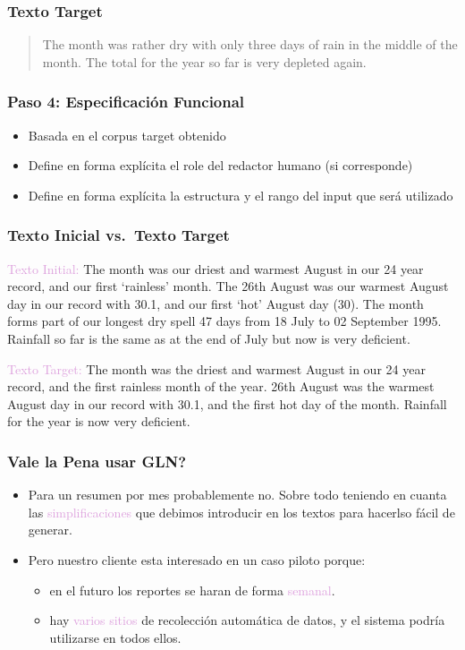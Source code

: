 \documentclass[compress,color=usenames]{beamer}
\newcommand{\mH}[1]{\textcolor{Plum}{#1}}
\begin{document}
\begin{frame}
\frametitle{Texto Target}

\begin{quote}
 { {The month was rather dry with only three days of rain in the middle of the month. The total for the year so far is very depleted again.}}
\end{quote}

\end{frame}

\begin{frame}
\frametitle{Paso 4: Especificaci\'on Funcional}

\label{f104}
\begin{itemize}
\item { {Basada en el corpus target obtenido}}
\item { {Define en forma expl\'icita el role del redactor humano (si corresponde)}}
\item { {Define en forma expl\'icita la estructura y el rango del input que ser\'a utilizado}}
\end{itemize}

\end{frame}

\begin{frame}
\frametitle{Texto Inicial vs.\ Texto Target}

\mH{Texto Initial:} The month was our driest and warmest August in our 24 year record, and our first `rainless' month. The 26th August was our warmest August day in our record with 30.1, and our first `hot' August day (30). The month forms part of our longest dry spell 47 days from 18 July to 02 September 1995. Rainfall so far is the same as at the end of July but now is very deficient.
\bigskip

\mH{Texto Target:} The month was the driest and warmest August in our 24 year record, and the first rainless month of the year. 26th August was the warmest August day in our record with 30.1, and the first hot day of the month. Rainfall for the year is now very deficient.
 \end{frame}

\begin{frame}
\frametitle{Vale la Pena usar GLN?}

\begin{itemize}
\item Para un resumen por mes probablemente no.  Sobre todo teniendo en cuanta las \mH{simplificaciones} que debimos introducir en los textos para hacerlso f\'acil de generar.

\item Pero nuestro cliente esta interesado en un caso piloto porque: 
\begin{itemize}
\item en el futuro los reportes se haran de forma \mH{semanal}. 
\item hay \mH{varios sitios} de recolecci\'on autom\'atica de datos, y el sistema podr\'ia utilizarse en todos ellos. 
\end{itemize}
\end{itemize}

\end{frame}
\end{document}
